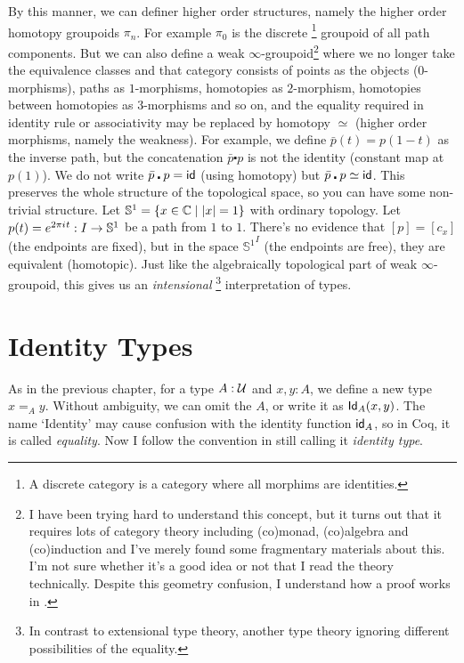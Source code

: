 By this manner, we can definer higher order structures, namely the higher
order homotopy groupoids $\pi_n$. For example $\pi_0$ is the discrete
\footnote{A discrete category is a category where all morphims are
identities.} groupoid of all path components. But we can also define a
weak $\infty$-groupoid\footnote{I have been trying hard to understand
this concept, but it turns out that it requires lots of category theory
including (co)monad, (co)algebra and (co)induction 
\cite{types-are-weak-groupoids} and I've merely found
some fragmentary materials about this. I'm not sure whether
it's a good idea or not that I read the theory technically. Despite
this geometry confusion, I understand how a proof works in 
\cite{homotopy-type-theory}.} where we no longer take the equivalence 
classes and that category consists of points as the objects 
($0$-morphisms), paths as $1$-morphisms, homotopies as $2$-morphism, 
homotopies between homotopies as $3$-morphisms and so on, and the
equality required in identity rule or associativity may be replaced by 
homotopy $\simeq$ (higher order morphisms, namely the weakness).
For example, we define $\bar{p}(t)=p(1-t)$ as the inverse path,
but the concatenation $\bar{p}\centerdot p$ is not the identity 
(constant map at $p(1)$). We do not write $\bar{p}\centerdot p=\text{\sf id}$ 
(using homotopy) but $\bar{p}\centerdot p\simeq \text{\sf id}$. This 
preserves the whole structure of the topological space, so you can
have some non-trivial structure.\newcommand{\sphere}{\mathbb{S}}
Let $\sphere^1=\{x\in\complex\mid |x| = 1\}$ with ordinary 
topology. Let $p(t) = e^{2\pi\iu t}: I\to \sphere^1$ be a path from
$1$ to $1$. There's no evidence that $[p]=[c_x]$ (the endpoints are 
fixed), but in the space ${\sphere^1}^I$ (the endpoints are free), 
they are equivalent (homotopic). Just like the algebraically topological
part of weak $\infty$-groupoid, this gives us an {\it intensional}
\footnote{In contrast to extensional type theory, another type theory
ignoring different possibilities of the equality.} interpretation of types.

\section{Identity Types}

As in the previous chapter, for a type $A:\mathcal{U}$ and $x,y:A$,
we define a new type $x =_A y$. Without ambiguity, we can omit the $A$,
or write it as $\text{\sf Id}_A(x, y)$. The name `Identity' may cause confusion with
the identity function $\text{\sf id}_A$, so in Coq\cite{coq}, it is called {\it 
equality}. Now I follow the convention in \cite{homotopy-type-theory} still
calling it {\it identity type}.

